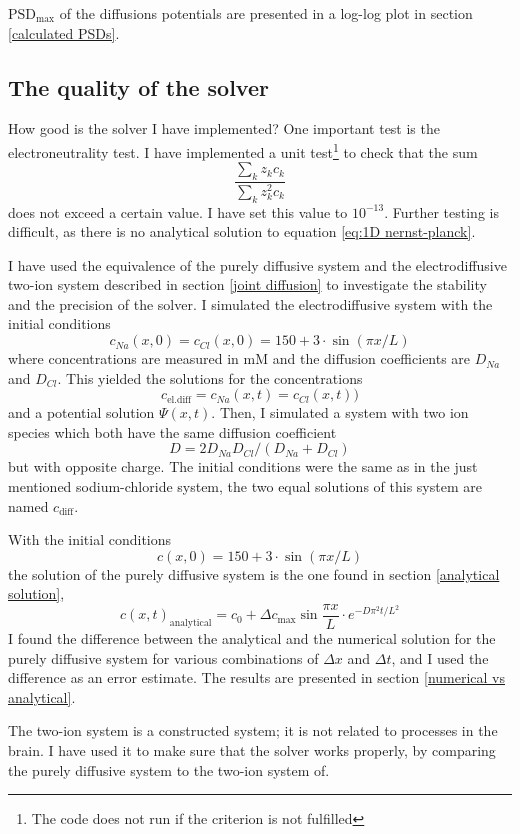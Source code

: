 \documentclass{article}
\begin{document}
 
$\text{PSD}_{\text{max}}$ of the diffusions potentials are presented in a log-log plot in section \ref{calculated PSDs}. 

\subsection{The quality of the solver}
How good is the solver I have implemented? One important test is the electroneutrality test. I have implemented a unit test\footnote{The code does not run if the criterion is not fulfilled} to check that the sum 
$$\frac{\sum_k z_k c_k}{\sum_k z_k^2 c_k}$$
does not exceed a certain value. I have set this value to $10^{-13}$. Further testing is difficult, as there is no analytical solution to equation \ref{eq:1D nernst-planck}. 


I have used the equivalence of the purely diffusive system and the electrodiffusive two-ion system described in section \ref{joint diffusion} to investigate the stability and the precision of the solver. I simulated the electrodiffusive system with the initial conditions 
$$c_{Na}(x,0)=c_{Cl}(x,0)=150+3\cdot \sin(\pi x/L)$$
where concentrations are measured in mM and the diffusion coefficients are $D_{Na}$ and $D_{Cl}$. This yielded the solutions for the concentrations
$$c_{\text{el.diff}} =c_{Na}(x,t)=c_{Cl}(x,t))$$
and a potential solution $\Psi(x,t)$. Then, I simulated a system with two ion species which both have the same diffusion coefficient 
$$D=2D_{Na}D_{Cl}/(D_{Na}+D_{Cl})$$ 
but with opposite charge. The initial conditions were the same as in the just mentioned sodium-chloride system, the two equal solutions of this system are named $c_{\text{diff}}$.

With the initial conditions 
$$c(x,0)=150+3\cdot \sin(\pi x/L)$$
 the solution of the purely diffusive system is the one found in section \ref{analytical solution}, 
$$c(x,t)_{\text{analytical}} =c_0 + \Delta c_{\text{max}} \sin \frac{ \pi x}{L}\cdot e^{-D\pi^2 t /L^2}$$
I found the difference between the analytical and the numerical solution for the purely diffusive system for various combinations of $\Delta x$ and $\Delta t$, and I used the difference as an error estimate. The results are presented in section \ref{numerical vs analytical}. 

The two-ion system is a constructed system; it is not related to processes in the brain. I have used it to make sure that the solver works properly, by comparing the purely diffusive system to the two-ion system of. 
\end{document}
